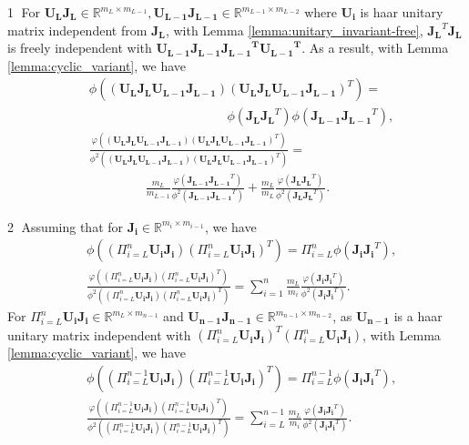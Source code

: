 \documentclass[10pt,journal,compsoc]{IEEEtran}
\begin{document}
\textcircled{1} For $\mathbf{U_LJ_L}\in\mathbb{R}^{m_L\times m_{L-1}}, \mathbf{U_{L-1}J_{L-1}} \in \mathbb{R}^{m_{L-1}\times m_{L-2}}$ where $\mathbf{U_i}$ is haar unitary matrix independent from $\mathbf{J_{L}}$, with Lemma \ref{lemma:unitary_invariant-free}, $\mathbf{J_L}^T\mathbf{J_L}$ is freely independent with $\mathbf{\mathbf{U_{L-1}J_{L-1}J_{L-1}}^T\mathbf{U_{L-1}}^T}$. As a result, with Lemma \ref{lemma:cyclic_variant}, we have
\begin{equation}
\begin{split}
    & \phi\left((\mathbf{U_LJ_LU_{L-1}J_{L-1}})(\mathbf{U_LJ_LU_{L-1}J_{L-1}})^T\right) =\\ 
    & ~~~~~~~~~~~~~~~~~~~~~~~~~~~~~~~~~~~~~~~~~~~~~~~~~\phi(\mathbf{J_LJ_L}^T)\phi(\mathbf{J_{L-1}J_{L-1}}^T),\\
    & \frac{\varphi((\mathbf{U_LJ_LU_{L-1}J_{L-1}})(\mathbf{U_LJ_LU_{L-1}J_{L-1}})^T)}{\phi^2\left((\mathbf{U_LJ_LU_{L-1}J_{L-1}})(\mathbf{U_LJ_LU_{L-1}J_{L-1}})^T\right)} =\\
    & ~~~~~~~~~~~~~~~~~~~~\frac{m_L}{m_{L-1}}\frac{\varphi(\mathbf{J_{L-1}J_{L-1}}^T)}{\phi^2(\mathbf{J_{L-1}J_{L-1}}^T)} + \frac{m_L}{m_L}\frac{\varphi(\mathbf{J_LJ_L}^T)}{\phi^2(\mathbf{J_LJ_L}^T)}.
\end{split}
\end{equation}

\textcircled{2} Assuming that for $\mathbf{J_i}\in \mathbb{R}^{m_{i}\times m_{i-1}}$, we have
\begin{equation}
\begin{split}
    & \phi\left((\Pi_{i=L}^n\mathbf{U_iJ_i})(\Pi_{i=L}^n\mathbf{U_iJ_i})^T\right) = \Pi_{i=L}^n\phi(\mathbf{J_iJ_i}^T),\\
    & \frac{\varphi((\Pi_{i=L}^n\mathbf{U_iJ_i})(\Pi_{i=L}^n\mathbf{U_iJ_i})^T)}{\phi^2\left((\Pi_{i=L}^n\mathbf{U_iJ_i})(\Pi_{i=L}^n\mathbf{U_iJ_i})^T\right)} = \sum_{i=1}^n\frac{m_{L}}{m_{i}}\frac{\varphi(\mathbf{J_iJ_i}^T)}{\phi^2(\mathbf{J_iJ_i}^T)}.
\end{split}
\end{equation}
For $\Pi_{i=L}^n\mathbf{U_iJ_i} \in \mathbb{R}^{m_L\times m_{n-1}}$ and $\mathbf{U_{n-1}J_{n-1}} \in \mathbb{R}^{m_{n-1}\times m_{n-2}}$, as $\mathbf{U_{n-1}}$ is a haar unitary matrix independent with $(\Pi_{i=L}^n\mathbf{U_iJ_i})^T(\Pi_{i=L}^n\mathbf{U_iJ_i})$, with Lemma \ref{lemma:cyclic_variant}, we have
\begin{equation}
    \begin{split}
        & \phi\left((\Pi_{i=L}^{n-1}\mathbf{U_iJ_i})(\Pi_{i=L}^{n-1}\mathbf{U_iJ_i})^T\right) = \Pi_{i=L}^{n-1}\phi(\mathbf{J_iJ_i}^T),\\
        & \frac{\varphi((\Pi_{i=L}^{n-1}\mathbf{U_iJ_i})(\Pi_{i=L}^{n-1}\mathbf{U_iJ_i})^T)}{\phi^2\left((\Pi_{i=L}^{n-1}\mathbf{U_iJ_i})(\Pi_{i=L}^{n-1}\mathbf{U_iJ_i})^T\right)} = \sum_{i=L}^{n-1}\frac{m_{L}}{m_{i}}\frac{\varphi(\mathbf{J_iJ_i}^T)}{\phi^2(\mathbf{J_iJ_i}^T)}.
    \end{split}
\end{equation}
\end{document}
